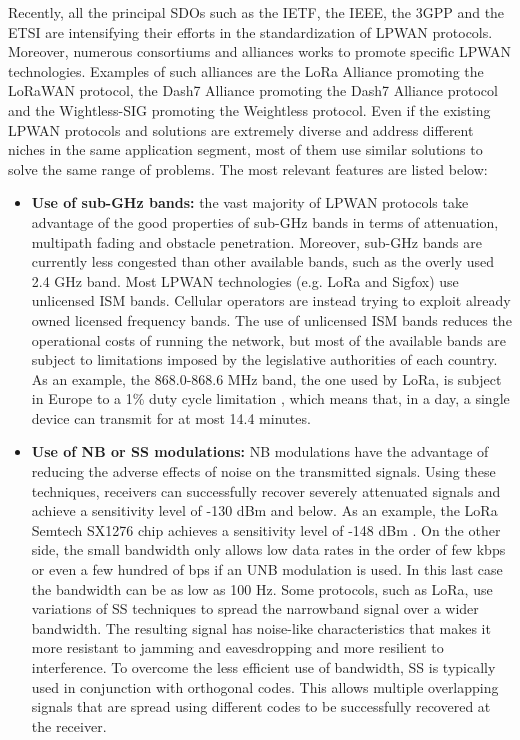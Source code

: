 Recently, all the principal \glspl{SDO} such as the \gls{IETF}, the \gls{IEEE}, the \gls{3GPP} and the \gls{ETSI} are intensifying their efforts in the standardization of \gls{LPWAN} protocols. Moreover, numerous consortiums and alliances works to promote specific \gls{LPWAN} technologies. Examples of such alliances are the LoRa Alliance promoting the LoRaWAN protocol, the Dash7 Alliance promoting the Dash7 Alliance protocol and the Wightless-SIG promoting the Weightless protocol. Even if the existing \gls{LPWAN} protocols and solutions are extremely diverse and address different niches in the same application segment, most of them use similar solutions to solve the same range of problems. The most relevant features are listed below:

\begin{itemize}
\item \textbf{Use of sub-GHz bands:} the vast majority of \gls{LPWAN} protocols take advantage of the good properties of sub-GHz bands in terms of attenuation, multipath fading and obstacle penetration. Moreover, sub-GHz bands are currently less congested than other available bands, such as the overly used 2.4 GHz band. Most \gls{LPWAN} technologies (e.g. LoRa and Sigfox) use unlicensed \gls{ISM} bands. Cellular operators are instead trying to exploit already owned licensed frequency bands. The use of unlicensed \gls{ISM} bands reduces the operational costs of running the network, but most of the available bands are subject to limitations imposed by the legislative authorities of each country. As an example, the 868.0-868.6 MHz band, the one used by LoRa, is subject in Europe to a 1\% duty cycle limitation \cite{ref:bg-regulations}, which means that, in a day, a single device can transmit for at most 14.4 minutes.

\item \textbf{Use of \gls{NB} or \gls{SS} modulations:} \gls{NB} modulations have the advantage of reducing the adverse effects of noise on the transmitted signals. Using these techniques, receivers can successfully recover severely attenuated signals and achieve a sensitivity level of -130 dBm and below. As an example, the LoRa Semtech SX1276 chip achieves a sensitivity level of -148 dBm \cite{ref:bg-sx1276}. On the other side, the small bandwidth only allows low data rates in the order of few kbps or even a few hundred of bps if an \gls{UNB} modulation is used. In this last case the bandwidth can be as low as 100 Hz. Some protocols, such as LoRa, use variations of \gls{SS} techniques to spread the narrowband signal over a wider bandwidth. The resulting signal has noise-like characteristics that makes it more resistant to jamming and eavesdropping and more resilient to interference. To overcome the less efficient use of bandwidth, \gls{SS} is typically used in conjunction with orthogonal codes. This allows multiple overlapping signals that are spread using different codes to be successfully recovered at the receiver.


\end{itemize}
